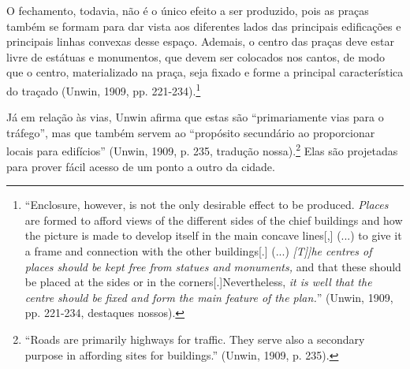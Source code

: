 \documentclass[12pt, a4paper]{book} %
\begin{document}
        O fechamento, todavia, não é o único efeito a ser produzido, pois as praças também se formam para dar vista aos diferentes lados das principais edificações e principais linhas convexas desse espaço. Ademais, o centro das praças deve estar livre de estátuas e monumentos, que devem ser colocados nos cantos, de modo que o centro, materializado na praça, seja fixado e forme a principal característica do traçado (Unwin, 1909, pp. 221-234).\footnote[70]{``Enclosure, however, is not the only desirable effect to be produced. \textit{Places} are formed to afford views of the different sides of the chief buildings and how the picture is made to develop itself in the main concave lines[,] (...) to give it a frame and connection with the other buildings[.] (...) \textit{[T]]he centres of places should be kept free from statues and monuments,} and that these should be placed at the sides or in the corners[.]Nevertheless, \textit{it is well that the centre should be fixed and form the main feature of the plan.}'' (Unwin, 1909, pp. 221-234, destaques nossos).}

        Já em relação às vias, Unwin afirma que estas são ``primariamente vias para o tráfego'', mas que também servem ao ``propósito secundário ao proporcionar locais para edifícios'' (Unwin, 1909, p. 235, tradução nossa).\footnote[71]{``Roads are primarily highways for traffic. They serve also a secondary purpose in affording sites for buildings.'' (Unwin, 1909, p. 235).} Elas são projetadas para prover fácil acesso de um ponto a outro da cidade.
\end{document}
